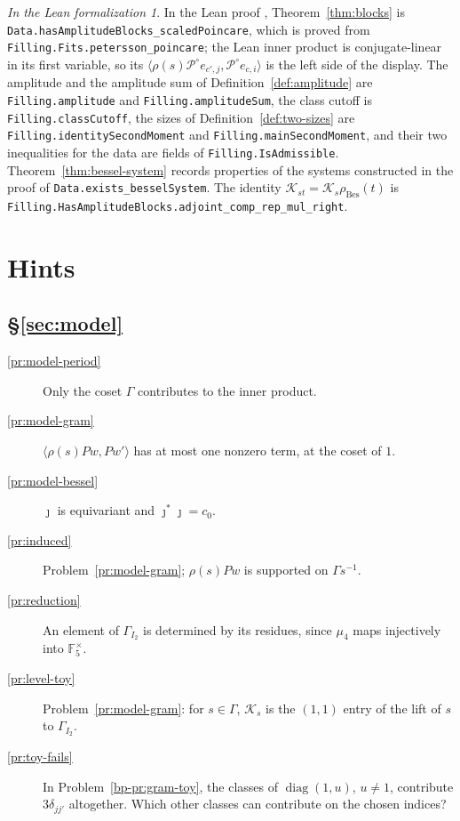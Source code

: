 \documentclass[reqno]{amsart}
\theoremstyle{definition}
\theoremstyle{plain}
\theoremstyle{remark}
\newtheorem*{leanremark}{In the Lean formalization}
\newcommand{\F}{\mathbb{F}}
\newcommand{\Kc}{\mathcal K}
\newcommand{\Po}{{\mathcal P^\circ}}
\newcommand{\rB}{\rho_{\mathrm{Bes}}}
\newcommand{\diag}{\operatorname{diag}}
\newcommand{\tl}[1]{\texttt{#1}}
\begin{document}
\begin{leanremark}
\raggedright In the Lean proof \cite{GL}, Theorem~\ref{thm:blocks} is \tl{Data.hasAmplitudeBlocks\_scaledPoincare}, which is proved from \tl{Filling.Fits.petersson\_poincare}; the Lean inner product is conjugate-linear in its first variable, so its \(\langle\rho(s)\Po e_{c',j},\Po e_{c,i}\rangle\) is the left side of the display.  The amplitude and the amplitude sum of Definition~\ref{def:amplitude} are \tl{Filling.amplitude} and \tl{Filling.amplitudeSum}, the class cutoff is \tl{Filling.classCutoff}, the sizes of Definition~\ref{def:two-sizes} are \tl{Filling.identitySecondMoment} and \tl{Filling.mainSecondMoment}, and their two inequalities for the data are fields of \tl{Filling.IsAdmissible}.  Theorem~\ref{thm:bessel-system} records properties of the systems constructed in the proof of \tl{Data.exists\_besselSystem}.  The identity \(\Kc_{st}=\Kc_s\rB(t)\) is \tl{Filling.HasAmplitudeBlocks.adjoint\_comp\_rep\_mul\_right}.
\end{leanremark}

\section*{Hints}

\subsection*{\S\ref{sec:model}}
\begin{description}
\item[\ref{pr:model-period}] Only the coset \(\Gamma\) contributes to the inner product.
\item[\ref{pr:model-gram}] \(\langle\rho(s)Pw,Pw'\rangle\) has at most one nonzero term, at the coset of \(1\).
\item[\ref{pr:model-bessel}] \(\jmath\) is equivariant and \(\jmath^*\jmath=c_0\).
\item[\ref{pr:induced}] Problem~\ref{pr:model-gram}; \(\rho(s)Pw\) is supported on \(\Gamma s^{-1}\).
\item[\ref{pr:reduction}] An element of \(\Gamma_{I_2}\) is determined by its residues, since \(\mu_4\) maps injectively into \(\F_5^\times\).
\item[\ref{pr:level-toy}] Problem~\ref{pr:model-gram}: for \(s\in\Gamma\), \(\Kc_s\) is the \((1,1)\) entry of the lift of \(s\) to \(\Gamma_{I_2}\).
\item[\ref{pr:toy-fails}] In Problem~\ref{bp-pr:gram-toy}, the classes of \(\diag(1,u)\), \(u\ne1\), contribute \(3\delta_{jj'}\) altogether.  Which other classes can contribute on the chosen indices?
\end{description}
\end{document}
